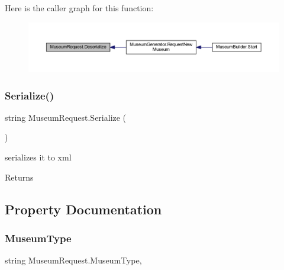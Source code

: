 Here is the caller graph for this function\+:
\nopagebreak
\begin{figure}[H]
\begin{center}
\leavevmode
\includegraphics[width=350pt]{class_museum_request_abd551a45744c8387841c20e5ef46d420_icgraph}
\end{center}
\end{figure}
\mbox{\label{class_museum_request_ae227bce4871f20bf6661db4a5af5fe1c}} 
\subsubsection{\texorpdfstring{Serialize()}{Serialize()}}
{\footnotesize\ttfamily string Museum\+Request.\+Serialize (\begin{DoxyParamCaption}{ }\end{DoxyParamCaption})}



serializes it to xml 

\begin{DoxyReturn}{Returns}

\end{DoxyReturn}


\subsection{Property Documentation}
\mbox{\label{class_museum_request_a55a4ab7c95751f54af3f8ced9d81ba76}} 
\subsubsection{\texorpdfstring{Museum\+Type}{MuseumType}}
{\footnotesize\ttfamily string Museum\+Request.\+Museum\+Type\hspace{0.3cm}{\ttfamily [get]}, {\ttfamily [set]}}



